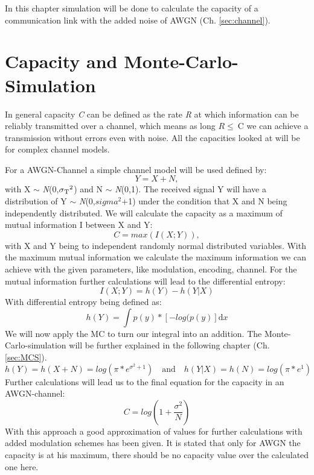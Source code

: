 \documentclass[12pt,oneside, draft]{report}
\begin{document}
In this chapter simulation will be done to calculate the capacity of a communication link with the added noise of AWGN (Ch. \ref{sec:channel}).

\section{Capacity and Monte-Carlo-Simulation}
\label{sec:capAWGN}

In general capacity \textit{C} can be defined as the rate \textit{R} at which information can be reliably transmitted over a channel, which means as long $R \leq \ $C we can achieve a transmission without errors even with noise. All the capacities looked at will be for complex channel models.

For a \gls{AWGN}-Channel a simple channel model will be used defined by:
\begin{equation}
\label{eq:chanAWGN}
 Y = X + N,   
\end{equation}
with X $\sim$ \textit{N}(0,$\sigma\textsubscript{T}^2$) and N $\sim$ \textit{N}(0,1). The received signal Y will have a distribution of Y $\sim$ \textit{N}(0,$sigma^2$+1) under the condition that X and N being independently distributed.
We will calculate the capacity as a maximum of mutual information I between X and Y:
\begin{equation}
\label{eq:cap}
C = max(I(X;Y)),     
\end{equation}
with X and Y being to independent randomly normal distributed variables.
With the maximum mutual information we calculate the maximum information we can achieve with the given parameters, like modulation, encoding, channel. 
\newline
For the mutual information further calculations will lead to the differential entropy:
\begin{equation}
I(X;Y) = h(Y) - h(Y|X)
\end{equation}
\newline
With differential entropy being defined as:
\begin{equation}
h(Y) = \int p(y)*[-log(p(y)] \mathrm{d}x
\end{equation}
We will now apply the \gls{MC} to turn our integral into an addition. The Monte-Carlo-simulation will be further explained in the following chapter (Ch. \ref{sec:MCS}).
\begin{equation}
h(Y) = h(X+N) = log(\pi*e^{\sigma^2+1}) \quad \textrm{and} \quad h(Y|X) = h(N) = log(\pi*e^{1})
\end{equation}
Further calculations will lead us to the final equation for the capacity in an AWGN-channel:
\begin{equation}
C = log(1+\frac{\sigma^2}{N})
\end{equation}
With this approach a good approximation of values for further calculations with added modulation schemes has been given. It is stated that only for \gls{AWGN} the capacity is at his maximum, there should be no capacity value over the calculated one here. 
\end{document}
